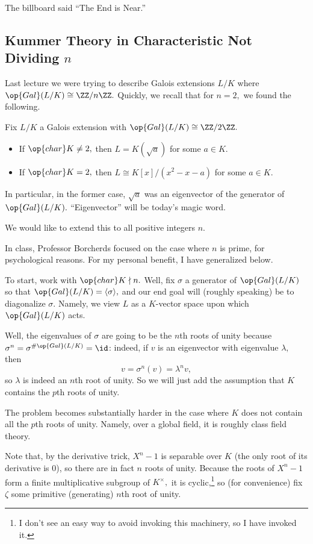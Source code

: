 













The billboard said ``The End is Near.''

\subsection{Kummer Theory in Characteristic Not Dividing \texorpdfstring{$n$}{n}}
Last lecture we were trying to describe Galois extensions $L/K$ where $\op{Gal}(L/K)\cong\ZZ/n\ZZ.$ Quickly, we recall that for $n=2,$ we found the following.
\begin{proposition}
	Fix $L/K$ a Galois extension with $\op{Gal}(L/K)\cong\ZZ/2\ZZ.$
	\begin{itemize}
		\item If $\op{char}K\ne2,$ then $L=K(\sqrt a)$ for some $a\in K.$
		\item If $\op{char}K=2,$ then $L\cong K[x]/\left(x^2-x-a\right)$ for some $a\in K.$
	\end{itemize}
\end{proposition}
\begin{remark}
	In particular, in the former case, $\sqrt a$ was an eigenvector of the generator of $\op{Gal}(L/K).$ ``Eigenvector'' will be today's magic word.
\end{remark}
We would like to extend this to all positive integers $n.$
\begin{warn}
	In class, Professor Borcherds focused on the case where $n$ is prime, for psychological reasons. For my personal benefit, I have generalized below.
\end{warn}
To start, work with $\op{char}K\nmid n.$ Well, fix $\sigma$ a generator of $\op{Gal}(L/K)$ so that $\op{Gal}(L/K)=\langle\sigma\rangle,$ and our end goal will (roughly speaking) be to diagonalize $\sigma.$ Namely, we view $L$ as a $K$-vector space upon which $\op{Gal}(L/K)$ acts.

Well, the eigenvalues of $\sigma$ are going to be the $n$th roots of unity because $\sigma^n=\sigma^{\#\op{Gal}(L/K)}=\id$: indeed, if $v$ is an eigenvector with eigenvalue $\lambda,$ then
\[v=\sigma^n(v)=\lambda^nv,\]
so $\lambda$ is indeed an $n$th root of unity. So we will just add the assumption that $K$ contains the $p$th roots of unity.
\begin{warn}
	The problem becomes substantially harder in the case where $K$ does not contain all the $p$th roots of unity. Namely, over a global field, it is roughly class field theory.
\end{warn}
Note that, by the derivative trick, $X^n-1$ is separable over $K$ (the only root of its derivative is $0$), so there are in fact $n$ roots of unity. Because the roots of $X^n-1$ form a finite multiplicative subgroup of $K^\times,$ it is cyclic,\footnote{I don't see an easy way to avoid invoking this machinery, so I have invoked it.} so (for convenience) fix $\zeta$ some primitive (generating) $n$th root of unity.

